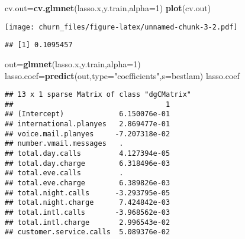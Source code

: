 \documentclass[]{article}
\newenvironment{Shaded}{\begin{snugshade}}{\end{snugshade}}
\newcommand{\KeywordTok}[1]{\textcolor[rgb]{0.13,0.29,0.53}{\textbf{#1}}}
\newcommand{\DataTypeTok}[1]{\textcolor[rgb]{0.13,0.29,0.53}{#1}}
\newcommand{\DecValTok}[1]{\textcolor[rgb]{0.00,0.00,0.81}{#1}}
\newcommand{\StringTok}[1]{\textcolor[rgb]{0.31,0.60,0.02}{#1}}
\newcommand{\OperatorTok}[1]{\textcolor[rgb]{0.81,0.36,0.00}{\textbf{#1}}}
\newcommand{\NormalTok}[1]{#1}
\begin{document}
\begin{Shaded}
\begin{Highlighting}[]
\NormalTok{cv.out=}\KeywordTok{cv.glmnet}\NormalTok{(lasso.x,y.train,}\DataTypeTok{alpha=}\DecValTok{1}\NormalTok{)}
\KeywordTok{plot}\NormalTok{(cv.out)}
\end{Highlighting}
\end{Shaded}

\texttt{[image: churn\_files/figure-latex/unnamed-chunk-3-2.pdf]}

\begin{Shaded}
\end{Shaded}

\begin{verbatim}
## [1] 0.1095457
\end{verbatim}

\begin{Shaded}
\begin{Highlighting}[]
\NormalTok{out=}\KeywordTok{glmnet}\NormalTok{(lasso.x,y.train,}\DataTypeTok{alpha=}\DecValTok{1}\NormalTok{)}
\NormalTok{lasso.coef=}\KeywordTok{predict}\NormalTok{(out,}\DataTypeTok{type=}\StringTok{"coefficients"}\NormalTok{,}\DataTypeTok{s=}\NormalTok{bestlam)}
\NormalTok{lasso.coef}
\end{Highlighting}
\end{Shaded}

\begin{verbatim}
## 13 x 1 sparse Matrix of class "dgCMatrix"
##                                    1
## (Intercept)             6.150076e-01
## international.planyes   2.869477e-01
## voice.mail.planyes     -7.207318e-02
## number.vmail.messages   .           
## total.day.calls         4.127394e-05
## total.day.charge        6.318496e-03
## total.eve.calls         .           
## total.eve.charge        6.389826e-03
## total.night.calls      -3.293795e-05
## total.night.charge      7.424842e-03
## total.intl.calls       -3.968562e-03
## total.intl.charge       2.996543e-02
## customer.service.calls  5.089376e-02
\end{verbatim}
\end{document}
